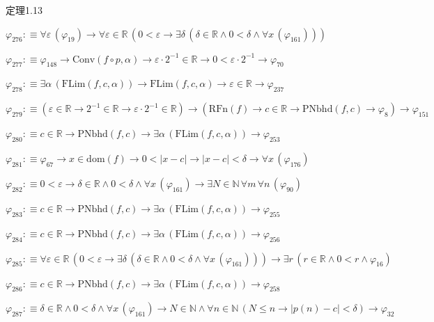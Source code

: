 \begin{fullproof}{定理1.13}
\begin{abbrevlist}
\item $\varphi_{276} :\equiv \forall \varepsilon\,(\varphi_{19}) \to \forall \varepsilon \in \mathbb{R}\,(0 < \varepsilon \to \exists \delta\,(\delta \in \mathbb{R} \land 0 < \delta \land \forall x\,(\varphi_{161})))$
\item $\varphi_{277} :\equiv \varphi_{148} \to \mathrm{Conv}(f \circ p,\alpha) \to \varepsilon \cdot 2^{-1} \in \mathbb{R} \to 0 < \varepsilon \cdot 2^{-1} \to \varphi_{70}$
\item $\varphi_{278} :\equiv \exists \alpha\,(\mathrm{FLim}(f,c,\alpha)) \to \mathrm{FLim}(f,c,\alpha) \to \varepsilon \in \mathbb{R} \to \varphi_{237}$
\item $\varphi_{279} :\equiv (\varepsilon \in \mathbb{R} \to 2^{-1} \in \mathbb{R} \to \varepsilon \cdot 2^{-1} \in \mathbb{R}) \to (\mathrm{RFn}(f) \to c \in \mathbb{R} \to \mathrm{PNbhd}(f,c) \to \varphi_{8}) \to \varphi_{151}$
\item $\varphi_{280} :\equiv c \in \mathbb{R} \to \mathrm{PNbhd}(f,c) \to \exists \alpha\,(\mathrm{FLim}(f,c,\alpha)) \to \varphi_{253}$
\item $\varphi_{281} :\equiv \varphi_{67} \to x \in \mathrm{dom}(f) \to 0 < \lvert x - c \rvert \to \lvert x - c \rvert < \delta \to \forall x\,(\varphi_{176})$
\item $\varphi_{282} :\equiv 0 < \varepsilon \to \delta \in \mathbb{R} \land 0 < \delta \land \forall x\,(\varphi_{161}) \to \exists N \in \mathbb{N}\,\forall m\,\forall n\,(\varphi_{90})$
\item $\varphi_{283} :\equiv c \in \mathbb{R} \to \mathrm{PNbhd}(f,c) \to \exists \alpha\,(\mathrm{FLim}(f,c,\alpha)) \to \varphi_{255}$
\item $\varphi_{284} :\equiv c \in \mathbb{R} \to \mathrm{PNbhd}(f,c) \to \exists \alpha\,(\mathrm{FLim}(f,c,\alpha)) \to \varphi_{256}$
\item $\varphi_{285} :\equiv \forall \varepsilon \in \mathbb{R}\,(0 < \varepsilon \to \exists \delta\,(\delta \in \mathbb{R} \land 0 < \delta \land \forall x\,(\varphi_{161}))) \to \exists r\,(r \in \mathbb{R} \land 0 < r \land \varphi_{16})$
\item $\varphi_{286} :\equiv c \in \mathbb{R} \to \mathrm{PNbhd}(f,c) \to \exists \alpha\,(\mathrm{FLim}(f,c,\alpha)) \to \varphi_{258}$
\item $\varphi_{287} :\equiv \delta \in \mathbb{R} \land 0 < \delta \land \forall x\,(\varphi_{161}) \to N \in \mathbb{N} \land \forall n \in \mathbb{N}\,(N \leq n \to \lvert p(n) - c \rvert < \delta) \to \varphi_{32}$

\end{abbrevlist}
\end{fullproof}
